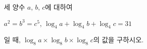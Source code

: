 세 양수 $a$, $b$, $c$에 대하여 \par\smallskip\noindent\hspace*{1.5em}$a^2=b^3=c^5$, $\log_4 a+\log_4 b+\log_4 c=31$\par\smallskip\noindent 일 때, $\log_8 a\times\log_8 b\times\log_8 c$의 값을 구하시오.
